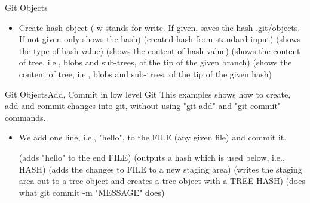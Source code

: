 \begin{frame}{Git Objects}
  \begin{itemize}
      \item Create hash object
         (-w stands for write. If given, saves the hash .git/objects. If not given only shows the hash)
         (created hash from standard input)
       (shows the type of hash value)
       (shows the content of hash value)
       (shows the content of tree, i.e., blobs and sub-trees, of the tip of the given branch)
       (shows the content of tree, i.e., blobs and sub-trees, of the tip of the given hash)
  \end{itemize}
\end{frame}
\begin{frame}{Git Objects}{Add, Commit in low level Git}
      This examples shows how to create, add and commit changes into
      git, without using "git add" and "git commit" commands.   
      \begin{itemize}
    \item We add one line, i.e., "hello", to the FILE (any given file) and commit it.

           (adds "hello" to the end FILE)
           (outputs a hash which is used below, i.e., HASH)
       (adds the changes to FILE to a new staging area)
       (writes the staging area out to a tree object and creates a tree object with a TREE-HASH)
           (does what git commit -m "MESSAGE" does)
  \end{itemize}
\end{frame}

